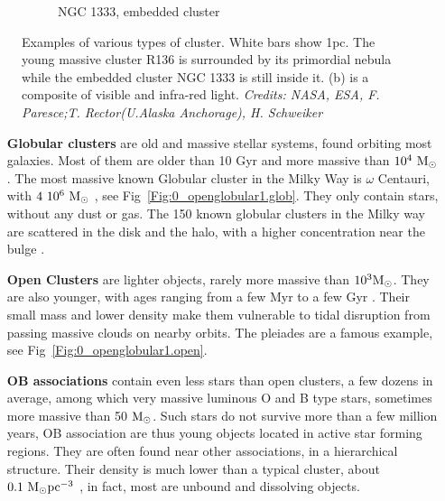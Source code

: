 \begin{figure}
\begin{subfigure}[b]{0.55\textwidth}
        \caption{NGC 1333, embedded cluster}
        \label{Fig:0_openglobular2.emb}
    \end{subfigure}
        \caption[Example clusters II - R136 and NGC 1333]{Examples of various types of cluster. White bars show 1pc. The young massive cluster R136 is  surrounded by its primordial nebula while the embedded cluster NGC 1333 is still inside it. (b) is a composite of visible and infra-red light. \textit{Credits: NASA, ESA, F. Paresce;T. Rector(U.Alaska Anchorage), H. Schweiker}}
    \label{Fig:0_ymcemb}
\end{figure}

\begin{itemize}


\item[\textbf{Globular clusters}] are old and massive stellar systems, found orbiting most galaxies. Most of them are older than 10 Gyr and more massive than $10^4~{\textrm{M}_\odot}$. The most massive known Globular cluster in the Milky Way is $\omega$ Centauri, with $4~10^6~{\textrm{M}_\odot}$ \citep{Dsouza2013}, see Fig~\ref{Fig:0_openglobular1.glob}. They only contain stars, without any dust or gas. The 150 known globular clusters in the Milky way are scattered in the disk and the halo, with a higher concentration near the bulge \citep{Harris1996}. 

\item[\textbf{Open Clusters}] are lighter objects, rarely more massive than $10^3 {\textrm{M}_\odot}$. They are also younger, with ages ranging from a few Myr to a few Gyr \citep{Dias2002}. Their small mass and lower density make them vulnerable to tidal disruption from passing massive clouds on nearby orbits. The pleiades are a famous example, see Fig~\ref{Fig:0_openglobular1.open}.

\item[\textbf{OB associations}] contain even less stars than open clusters, a few dozens in average, among which very massive luminous O and B type stars, sometimes more massive than 50 ${\textrm{M}_\odot}$. Such stars do not survive more than a few million years, OB association are thus young objects located in active star forming regions. They are often found near other associations, in a hierarchical structure.  Their density is much lower than a typical cluster, about $0.1 ~{\textrm{M}_\odot} \textrm{pc}^{-3}$ \citep{Wright2014,Garcia2010},  in fact, most are unbound and dissolving objects.


\end{itemize}
